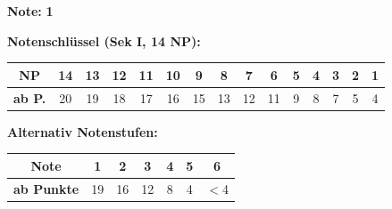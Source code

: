 \documentclass[11pt, a4paper]{article}
\newcommand{\lsg}[1]{\textcolor{loesung}{\textbf{#1}}}
\begin{document}
\vspace{10pt}

\begin{flushright}
\textbf{Note:} \lsg{1}
\end{flushright}

\vspace{1em}

\textbf{Notenschlüssel (Sek I, 14 NP):}

\begin{tabular}{|c|c|c|c|c|c|c|c|c|c|c|c|c|c|c|}
\hline
\textbf{NP} & 14 & 13 & 12 & 11 & 10 & 9 & 8 & 7 & 6 & 5 & 4 & 3 & 2 & 1 \\
\hline
\textbf{ab P.} & 20 & 19 & 18 & 17 & 16 & 15 & 13 & 12 & 11 & 9 & 8 & 7 & 5 & 4 \\
\hline
\end{tabular}

\vspace{1em}

\textbf{Alternativ Notenstufen:}

\begin{tabular}{|c|c|c|c|c|c|c|}
\hline
\textbf{Note} & 1 & 2 & 3 & 4 & 5 & 6 \\
\hline
\textbf{ab Punkte} & 19 & 16 & 12 & 8 & 4 & $<$4 \\
\hline
\end{tabular}
\end{document}
